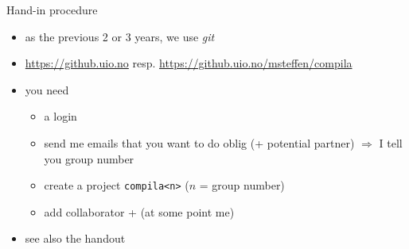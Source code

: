 \documentclass{beamer}
\begin{document}
\begin{frame}[label={sec:org6c97c8f},fragile]{Hand-in procedure}
 \begin{itemize}
\item as the previous 2 or 3 years, we use  \emph{git}

\item \url{https://github.uio.no} resp. \url{https://github.uio.no/msteffen/compila}

\item you need

\begin{itemize}
\item a login
\item send me emails that you want to do oblig (+ potential partner)
\(\Rightarrow\) I tell you group number
\item create a project \texttt{compila<n>} (\(n\) = group number)
\item add collaborator + (at some point me)
\end{itemize}
\end{itemize}


\begin{itemize}
\item see also the handout
\end{itemize}
\end{frame}






\end{document}
